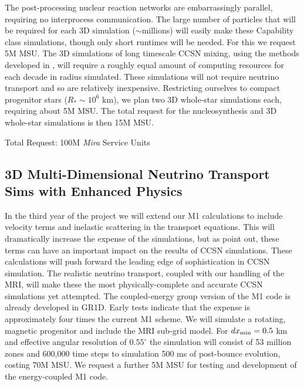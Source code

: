 The post-processing nuclear reaction networks are embarrassingly parallel, requiring no interprocess communication.
The large number of particles that will be required for each 3D simulation ($\sim$millions) will easily make these Capability class simulations, though only short runtimes will be needed.
For this we request 5M MSU.
The 3D simulations of long timescale CCSN mixing, using the methods developed in \citet{Couch:2011cf}, will require a roughly equal amount of computing resources for each decade in radius simulated.
These simulations will not require neutrino transport and so are relatively inexpensive.
Restricting ourselves to compact progenitor stars ($R_* \sim 10^{6}$ km), we plan two 3D whole-star simulations each, requiring about 5M MSU.  The total request for the nucleosynthesis and 3D whole-star simulations is then 15M MSU.

\vspace{0.1in}  Total Request: 100M {\it Mira} Service Units\vspace{-0.1in}

\subsection{3D Multi-Dimensional Neutrino Transport Sims with Enhanced Physics}
\label{sec:enhancedM1}

In the third year of the project we will extend our M1 calculations to include velocity terms and inelastic scattering in the transport equations.
This will dramatically increase the expense of the simulations, but as \citet{Lentz:2012fy} point out, these terms can have an important impact on the results of CCSN simulations.
These calculations will push forward the leading edge of sophistication in CCSN simulation.
The realistic neutrino transport, coupled with our handling of the MRI, will make these the most physically-complete and accurate CCSN simulations yet attempted.
The coupled-energy group version of the M1 code is already developed in GR1D.
Early tests indicate that the expense is approximately four times the current M1 scheme.
We will simulate a rotating, magnetic progenitor and include the MRI sub-grid model.
For $dx_{\rm min} = 0.5$ km and effective angular resolution of $0.55^\circ$ the simulation will consist of 53 million zones and 600,000 time steps to simulation 500 ms of post-bounce evolution, costing 70M MSU.
We request a further 5M MSU for testing and development of the energy-coupled M1 code.


